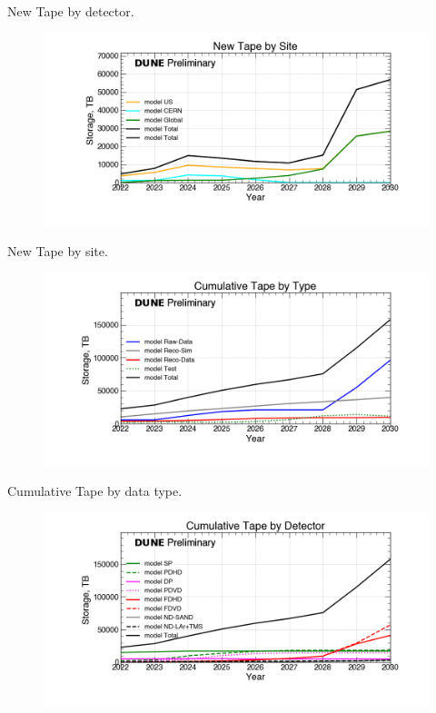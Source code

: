 \begin{table}[h]
\label{tab:TapeByYearByDetector}
\caption{New Tape by detector.}
\end{table}
\pagebreak
\begin{figure}[ht]
\centering\includegraphics[height=0.4\textwidth]{Feb24_noMWC_New-Tape-by-Site-Storage.png}\end{figure}
\begin{table}[h]
\label{tab:TapeByYearBySite}
\caption{New Tape by site.}
\end{table}
\pagebreak
\begin{figure}[ht]
\centering\includegraphics[height=0.4\textwidth]{Feb24_noMWC_Cumulative-Tape-by-Type-Storage.png}\end{figure}
\begin{table}[h]
\label{tab:TapeByYearByType}
\caption{Cumulative Tape by data type.}
\end{table}
\pagebreak
\begin{figure}[ht]
\centering\includegraphics[height=0.4\textwidth]{Feb24_noMWC_Cumulative-Tape-by-Detector-Storage.png}\end{figure}
